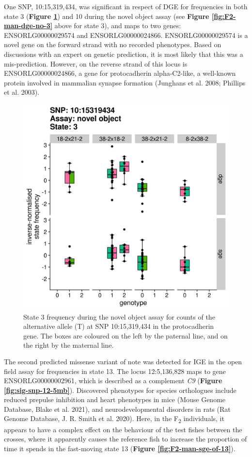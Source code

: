 \documentclass[
]{book}
\begin{document}
One SNP, 10:15,319,434, was significant in respect of DGE for frequencies in both state 3 (\textbf{Figure \ref{fig:sig-snp-10-15mb}}) and 10 during the novel object assay (see \textbf{Figure \ref{fig:F2-man-dge-no-3}} above for state 3), and maps to two genes: ENSORLG00000029574 and ENSORLG00000024866. ENSORLG00000029574 is a novel gene on the forward strand with no recorded phenotypes. Based on discussions with an expert on genetic prediction, it is most likely that this was a mis-prediction. However, on the reverse strand of this locus is ENSORLG00000024866, a gene for protocadherin alpha-C2-like, a well-known protein involved in mammalian synapse formation (Junghans et al. 2008; Phillips et al. 2003).



\begin{figure}

{\centering \includegraphics[width=0.5\linewidth]{figs/mikk_behaviour/sig_snps_boxplots/3-10:15319434} 

}

\caption{State 3 frequency during the novel object assay for counts of the alternative allele (T) at SNP 10:15,319,434 in the protocadherin gene. The boxes are coloured on the left by the paternal line, and on the right by the maternal line.}\label{fig:sig-snp-10-15mb}
\end{figure}

The second predicted missense variant of note was detected for IGE in the open field assay for frequencies in state 13. The locus 12:5,136,828 maps to gene ENSORLG00000002961, which is described as a complement \emph{C9} (\textbf{Figure \ref{fig:sig-snp-12-5mb}}). Discovered phenotypes for species orthologues include reduced prepulse inhibition and heart phenotypes in mice (Mouse Genome Database, Blake et al. 2021), and neurodevelopmental disorders in rats (Rat Genome Database, J. R. Smith et al. 2020). Here, in the F\textsubscript{2} individuals, it appears to have a complex effect on the behaviour of the test fishes between the crosses, where it apparently causes the reference fish to increase the proportion of time it spends in the fast-moving state 13 (\textbf{Figure \ref{fig:F2-man-sge-of-13}}).
\end{document}
